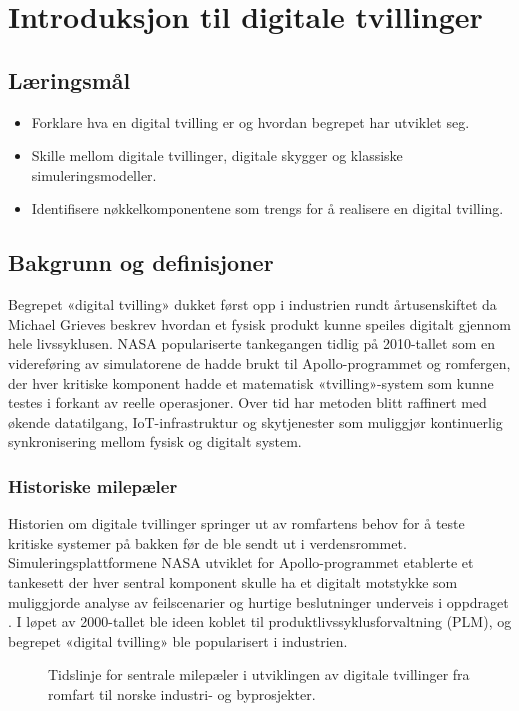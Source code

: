\chapter{Introduksjon til digitale tvillinger}

\section{Læringsmål}
\begin{itemize}
    \item Forklare hva en digital tvilling er og hvordan begrepet har utviklet seg.
    \item Skille mellom digitale tvillinger, digitale skygger og klassiske simuleringsmodeller.
    \item Identifisere nøkkelkomponentene som trengs for å realisere en digital tvilling.
\end{itemize}

\section{Bakgrunn og definisjoner}
Begrepet «digital tvilling» dukket først opp i industrien rundt årtusenskiftet da Michael Grieves beskrev hvordan et fysisk produkt kunne speiles digitalt gjennom hele livssyklusen. NASA populariserte tankegangen tidlig på 2010-tallet som en videreføring av simulatorene de hadde brukt til Apollo-programmet og romfergen, der hver kritiske komponent hadde et matematisk «tvilling»-system som kunne testes i forkant av reelle operasjoner. Over tid har metoden blitt raffinert med økende datatilgang, IoT-infrastruktur og skytjenester som muliggjør kontinuerlig synkronisering mellom fysisk og digitalt system.

\subsection{Historiske milepæler}
Historien om digitale tvillinger springer ut av romfartens behov for å teste kritiske systemer på bakken før de ble sendt ut i verdensrommet. Simuleringsplattformene NASA utviklet for Apollo-programmet etablerte et tankesett der hver sentral komponent skulle ha et digitalt motstykke som muliggjorde analyse av feilscenarier og hurtige beslutninger underveis i oppdraget \citep{glaessgen2012digital}. I løpet av 2000-tallet ble ideen koblet til produktlivssyklusforvaltning (PLM), og begrepet «digital tvilling» ble popularisert i industrien.

\begin{figure}[ht]
    \centering
    \resizebox{0.95\textwidth}{!}{}
    \caption{Tidslinje for sentrale milepæler i utviklingen av digitale tvillinger fra romfart til norske industri- og byprosjekter.}
    \label{fig:kap01-tidslinje}
\end{figure}

